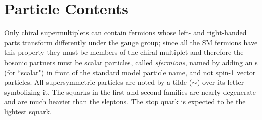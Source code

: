 %
%






\section{Particle Contents}
\label{sec:PartCont}

Only chiral supermultiplets can contain fermions whose left- and right-handed parts transform differently under the gauge group; since all the SM fermions have this property they must be members of the chiral multiplet and therefore the bosonic partners must be scalar particles, called \textit{sfermions}, named by adding an s (for ``scalar") in front of the standard model particle name, and not spin-1 vector particles.  All supersymmetric particles are noted by a tilde ($\sim$) over its letter symbolizing it.  The squarks in the first and second families are nearly degenerate and are much heavier than the sleptons.  The stop quark is expected to be the lightest squark.  %

